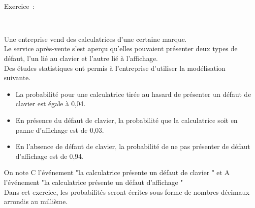 \documentclass[11pt,a4paper]{article}
\newcounter{numexos}%
\newcommand{\exercice}[1]{%
\addtocounter{numexos}{1}%
\textcolor{black}{\normalsize Exercice\,\thenumexos\,}\,#1%
}
\newcommand{\bex}[2]
{\begin{bclogo}[couleur = white,logo= , barre=none,  arrondi = 0.1]
{~\exercice:~~{#1}}
~~
{#2}
~~
\end{bclogo}}
\begin{document}
\bigskip

\newpage

\bex{}{
Une entreprise vend des calculatrices d'une certaine marque. \\
Le service après-vente s'est aperçu qu'elles pouvaient présenter deux types de défaut, l'un lié au clavier et l'autre lié à l'affichage. \\
Des études statistiques ont permis à l'entreprise d'utiliser la modélisation suivante. 
\begin{itemize}
    \item La probabilité pour une calculatrice tirée au hasard de présenter un défaut de clavier est égale à 0,04. 
    \item En présence du défaut de clavier, la probabilité que la calculatrice soit en panne d'affichage est de 0,03. 
    \item En l'absence de défaut de clavier, la probabilité de ne pas présenter de défaut d'affichage est de 0,94. 
\end{itemize}
On note C l'événement "la calculatrice présente un défaut de clavier " et A l'événement "la calculatrice présente un défaut d'affichage " \\
Dans cet exercice, les probabilités seront écrites sous forme de nombres décimaux arrondis au millième. 
}
\end{document}
